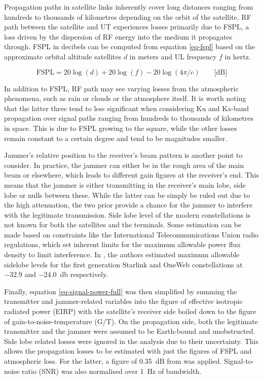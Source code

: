\documentclass[english, 12pt, a4paper, elec, utf8, a-1b, online]{aaltothesis}
\begin{document}
Propagation paths in satellite links inherently cover long distances ranging from hundreds to thousands of kilometres depending on the orbit of the satellite.
RF path between the satellite and UT experiences losses primarily due to FSPL, a loss driven by the dispersion of RF energy into the medium it propagates through.
FSPL in decibels can be computed from equation \ref{eq-fspl} based on the approximate orbital altitude satellites $d$ in meters and UL frequency $f$ in hertz.

\begin{equation} \label{eq-fspl}
  \mathrm{FSPL} = 20\log(d)+20\log(f)-20\log(4\pi / c) \qquad \text{[dB]}
\end{equation}

In addition to FSPL, RF path may see varying losses from the atmospheric phenomena, such as rain or clouds or the atmosphere itself.
It is worth noting that the latter three tend to less significant when considering Ku and Ka-band propagation over signal paths ranging from hundreds to thousands of kilometres in space.
This is due to FSPL growing to the square, while the other losses remain constant to a certain degree and tend to be magnitudes smaller.

Jammer's relative position to the receiver's beam pattern is another point to consider. In practice, the jammer can either be in the rough area of the main beam or elsewhere, which leads to different gain figures at the receiver's end. This means that the jammer is either transmitting in the receiver's main lobe, side lobe or nulls between these. While the latter can be simply be ruled out due to the high attenuation, the two prior provide a chance for the jammer to interfere with the legitimate transmission. Side lobe level of the modern constellations is not known for both the satellites and the terminals. Some estimation can be made based on constraints like the International Telecommunications Union radio regulations, which set inherent limits for the maximum allowable power flux density to limit interference. In \cite{hills2023controlling}, the authors estimated maximum allowable sidelobe levels for the first generation Starlink and OneWeb constellations at $-32.9$ and \qty{-24.0}{\decibel} respectively. 

Finally, equation \ref{eq-signal-power-full} was then simplified by summing the transmitter and jammer-related variables into the figure of effective isotropic radiated power (EIRP) with the satellite's receiver side boiled down to the figure of gain-to-noise-temperature (G/T).
On the propagation side, both the legitimate transmitter and the jammer were assumed to be Earth-bound and unobstructed.
Side lobe related losses were ignored in the analysis due to their uncertainty.
This allows the propagation losses to be estimated with just the figures of FSPL and atmospheric loss.
For the latter, a figure of \SI{0.35}{\deci\bel} from \cite{kymeta2019link} was applied. Signal-to-noise ratio (SNR) was also normalised over \SI{1}{\hertz} of bandwidth.
\end{document}
